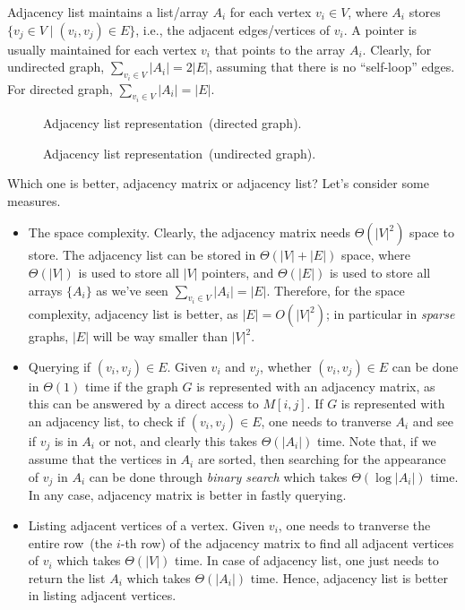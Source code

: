Adjacency list maintains a list/array $A_i$ for each vertex $v_i \in V$, where
$A_i$ stores $\{v_j \in V \mid (v_i, v_j) \in E\}$, i.e., the adjacent edges/vertices of $v_i$.
A pointer is usually maintained for each vertex $v_i$ that points to the array $A_i$.
Clearly, for undirected graph, $\sum_{v_i \in V} |A_i| = 2|E|$, assuming that there is no ``self-loop'' edges.
For directed graph, $\sum_{v_i \in V} |A_i| = |E|$.

\begin{figure}[h!]
\centering{}
\caption{Adjacency list representation~(directed graph).}
\end{figure}

\begin{figure}[h!]
\centering{}
\caption{Adjacency list representation~(undirected graph).}
\end{figure}

Which one is better, adjacency matrix or adjacency list? 
Let's consider some measures.
\vspace*{-\topsep}
\begin{itemize}
\item The space complexity. Clearly, the adjacency matrix needs $\Theta(|V|^2)$ space to store.
The adjacency list can be stored in $\Theta(|V| + |E|)$ space, where $\Theta(|V|)$ is used to
store all $|V|$ pointers, and $\Theta(|E|)$ is used to store all arrays $\{A_i\}$ as we've seen
$\sum_{v_i\in V} |A_i| = |E|$. Therefore, for the space complexity, adjacency list is better,
as $|E| = O(|V|^2)$; in particular in \emph{sparse} graphs, $|E|$ will be way smaller than $|V|^2$.

\item Querying if $(v_i,v_j)\in E$. Given $v_i$ and $v_j$, whether $(v_i,v_j)\in E$ can be done
in $\Theta(1)$ time if the graph $G$ is represented with an adjacency matrix, as this can be answered
by a direct access to $M[i,j]$.
If $G$ is represented with an adjacency list, to check if $(v_i,v_j)\in E$, one needs to tranverse
$A_i$ and see if $v_j$ is in $A_i$ or not, and clearly this takes $\Theta(|A_i|)$ time.
Note that, if we assume that the vertices in $A_i$ are sorted, then searching for the appearance of $v_j$
in $A_i$ can be done through \emph{binary search} which takes $\Theta(\log |A_i|)$ time.
In any case, adjacency matrix is better in fastly querying.

\item Listing adjacent vertices of a vertex. Given $v_i$, one needs to tranverse the entire row~(the $i$-th row) of the adjacency matrix
to find all adjacent vertices of $v_i$ which takes $\Theta(|V|)$ time.
In case of adjacency list, one just needs to return the list $A_i$ which takes $\Theta(|A_i|)$ time.
Hence, adjacency list is better in listing adjacent vertices.

\end{itemize}


